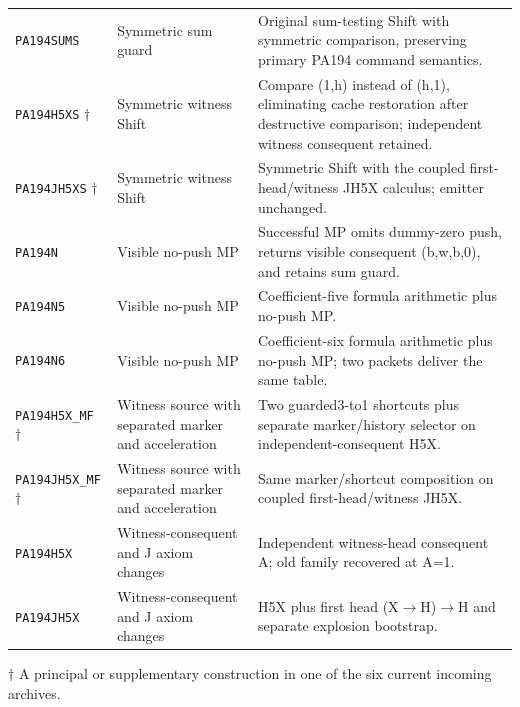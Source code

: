 \begin{longtable}{@{}>{\raggedright\arraybackslash}p{}>{\raggedright\arraybackslash}p{}>{\raggedright\arraybackslash}p{}@{}}
\nolinkurl{PA194SUMS} & Symmetric sum guard & Original sum-testing Shift with symmetric comparison, preserving primary PA194 command semantics.\\
\nolinkurl{PA194H5XS} $\dagger$ & Symmetric witness Shift & Compare (1,h) instead of (h,1), eliminating cache restoration after destructive comparison; independent witness consequent retained.\\
\nolinkurl{PA194JH5XS} $\dagger$ & Symmetric witness Shift & Symmetric Shift with the coupled first-head/witness JH5X calculus; emitter unchanged.\\
\nolinkurl{PA194N} & Visible no-push MP & Successful MP omits dummy-zero push, returns visible consequent (b,w,b,0), and retains sum guard.\\
\nolinkurl{PA194N5} & Visible no-push MP & Coefficient-five formula arithmetic plus no-push MP.\\
\nolinkurl{PA194N6} & Visible no-push MP & Coefficient-six formula arithmetic plus no-push MP; two packets deliver the same table.\\
\nolinkurl{PA194H5X_MF} $\dagger$ & Witness source with separated marker and acceleration & Two guarded3-to1 shortcuts plus separate marker/history selector on independent-consequent H5X.\\
\nolinkurl{PA194JH5X_MF} $\dagger$ & Witness source with separated marker and acceleration & Same marker/shortcut composition on coupled first-head/witness JH5X.\\
\nolinkurl{PA194H5X} & Witness-consequent and J axiom changes & Independent witness-head consequent A; old family recovered at A=1.\\
\nolinkurl{PA194JH5X} & Witness-consequent and J axiom changes & H5X plus first head (X$\to$H)$\to$H and separate explosion bootstrap.\\
\end{longtable}\endgroup
\noindent $\dagger$ A principal or supplementary construction in one of the six current incoming archives.
